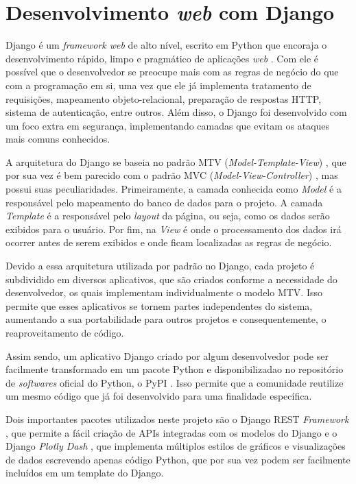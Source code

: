 \section{Desenvolvimento \textit{web} com Django}

\indent
\par Django é um \textit{framework web} de alto nível, escrito em Python que encoraja o desenvolvimento rápido, limpo e pragmático de aplicações \textit{web} \cite{Django}. Com ele é possível que o desenvolvedor se preocupe mais com as regras de negócio do que com a programação em si, uma vez que ele já implementa tratamento de requisições, mapeamento objeto-relacional, preparação de respostas HTTP, sistema de autenticação, entre outros. Além disso, o Django foi desenvolvido com um foco extra em segurança, implementando camadas que evitam os ataques mais comuns conhecidos.
\indent
\par A arquitetura do Django se baseia no padrão MTV (\textit{Model-Template-View}) \cite{MTV}, que por sua vez é bem parecido com o padrão MVC (\textit{Model-View-Controller}) \cite{MVC}, mas possui suas peculiaridades. Primeiramente, a camada conhecida como \textit{Model} é a responsável pelo mapeamento do banco de dados para o projeto. A camada \textit{Template} é a responsável pelo \textit{layout} da página, ou seja, como os dados serão exibidos para o usuário. Por fim, na \textit{View} é onde o processamento dos dados irá ocorrer antes de serem exibidos e onde ficam localizadas as regras de negócio.
\indent
\par Devido a essa arquitetura utilizada por padrão no Django, cada projeto é subdividido em diversos aplicativos, que são criados conforme a necessidade do desenvolvedor, os quais implementam individualmente o modelo MTV. Isso permite que esses aplicativos se tornem partes independentes do sistema, aumentando a sua portabilidade para outros projetos e consequentemente, o reaproveitamento de código.
\indent
\par Assim sendo, um aplicativo Django criado por algum desenvolvedor pode ser facilmente transformado em um pacote Python e disponibilizadao no repositório de \textit{softwares} oficial do Python, o PyPI \cite{PYPI}. Isso permite que a comunidade reutilize um mesmo código que já foi desenvolvido para uma finalidade específica.
\indent
\par Dois importantes pacotes utilizados neste projeto são o Django REST \textit{Framework} \cite{DjangoRF}, que permite a fácil criação de APIs integradas com os modelos do Django e o Django \textit{Plotly Dash} \cite{DjangoPD}, que implementa múltiplos estilos de gráficos e visualizações de dados escrevendo apenas código Python, que por sua vez podem ser facilmente incluídos em um template do Django.

